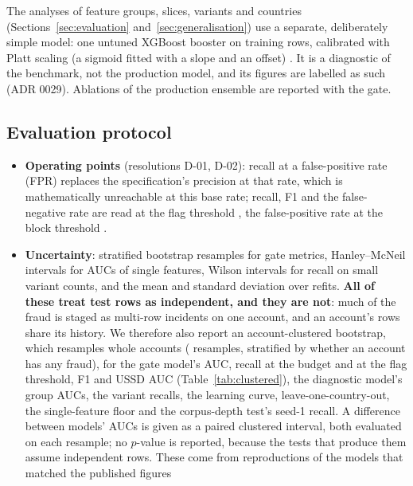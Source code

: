 The analyses of feature groups, slices, variants and countries (Sections~\ref{sec:evaluation}
and~\ref{sec:generalisation}) use a separate, deliberately simple model: one untuned XGBoost
booster on \nTrainUsed{} training rows, calibrated with Platt scaling (a sigmoid fitted with a slope and an offset) \cite{platt2000probabilistic}. It is a
diagnostic of the benchmark, not the production model, and its figures are labelled as such
(ADR 0029). Ablations of the production ensemble are reported with the gate.

\subsection{Evaluation protocol}

\begin{itemize}
  \item \textbf{Operating points} (resolutions D-01, D-02): recall at a \nFPRBudget{}
        false-positive rate (FPR) replaces the specification's precision at that rate, which is
        mathematically unreachable at this base rate; recall, F1 and the false-negative rate are
        read at the flag threshold \nFlagThreshold{}, the false-positive rate at the block
        threshold \nBlockThreshold{}.
  \item \textbf{Uncertainty}: \nResamples{} stratified bootstrap resamples
        \cite{efron1979bootstrap} for gate metrics, Hanley--McNeil intervals \cite{hanley1982auc}
        for AUCs of single features, Wilson intervals \cite{wilson1927interval} for
        recall on small variant counts, and the mean and standard deviation over \nSeeds{} refits.
        \textbf{All of these treat test rows as independent, and they are not}: much of the fraud is staged as
        multi-row incidents on one account, and an account's rows share its history. We therefore
        also report an account-clustered bootstrap, which resamples whole accounts (\nResamples{}
        resamples, stratified by whether an account has any fraud), for the gate model's AUC, recall at
        the budget and at the flag threshold, F1 and USSD AUC (Table~\ref{tab:clustered}), the
        diagnostic model's group AUCs, the variant recalls, the learning curve,
        leave-one-country-out, the single-feature floor and the corpus-depth test's seed-1 recall. A difference between models' AUCs
        is given as a paired clustered interval, both evaluated on each resample; no $p$-value is
        reported, because the tests that produce them assume independent rows. These come from
        reproductions of the models that matched the published figures

\end{itemize}
